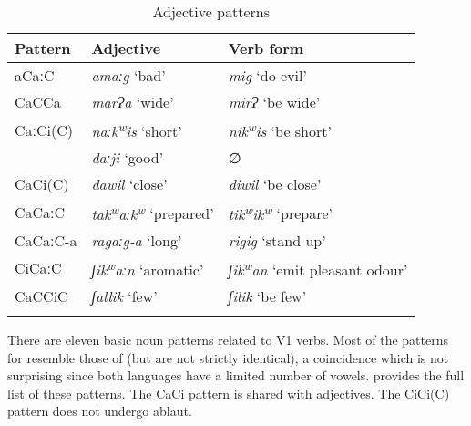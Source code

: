 \documentclass[output=paper]{langsci/langscibook}
\begin{document}
\begin{table}
\begin{tabular}{lll}
\lsptoprule
Pattern & Adjective & Verb form\\\midrule
aCaːC & \textit{amaːg} ‘bad’ & \textit{mig} ‘do evil’\\
CaCCa & \textit{marɁa} ‘wide’ & \textit{mirɁ} ‘be wide’\\
CaːCi(C) & \textit{naːk\textsuperscript{w}}\textit{is} ‘short’ & \textit{nik\textsuperscript{w}}\textit{is} ‘be short’\\
& \textit{daːji} ‘good’ & ∅\\
CaCi(C) & \textit{dawil} ‘close’ & \textit{diwil} ‘be close’\\
CaCaːC & \textit{tak\textsuperscript{w}}\textit{aːk\textsuperscript{w}} ‘prepared’ & \textit{tik\textsuperscript{w}}\textit{ik\textsuperscript{w}} ‘prepare’\\
CaCaːC-a & \textit{ragaːg-a} ‘long’ & \textit{rigig} ‘stand up’\\
CiCaːC & \textit{ʃik\textsuperscript{w}}\textit{aːn} ‘aromatic’ & \textit{ʃik\textsuperscript{w}}\textit{an} ‘emit pleasant odour’\\
CaCCiC & \textit{ʃallik} ‘few’ & \textit{ʃilik} ‘be few’\\
\lspbottomrule
\end{tabular} 
\caption{Adjective patterns}
\label{tab:vanhove:5}
\end{table}

There are eleven basic noun patterns related to V1 verbs. Most of the patterns for   resemble those of  (but are not strictly identical), a coincidence which is not surprising since both languages have a limited number of vowels.  provides the full list of these patterns. The CaCi pattern is shared with adjectives. The CiCi(C) pattern does not undergo ablaut.
\end{document}

